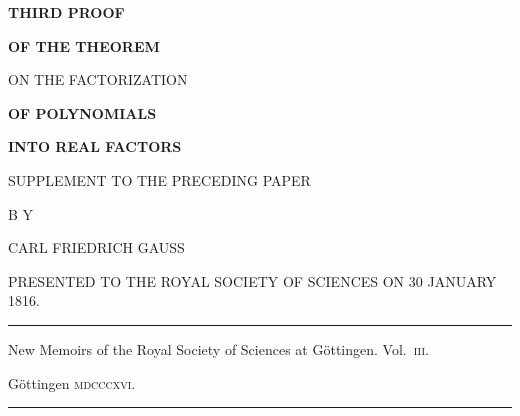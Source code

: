 \clearpage
{}
\thispagestyle{empty}
\begin{center}
\vspace*{.25in}
{\large\bfseries THIRD PROOF}\par
\vspace{.35in}
{\Large\bfseries OF THE THEOREM\par
\medskip ON THE FACTORIZATION}\par
\vspace{.35in}
{\bfseries OF POLYNOMIALS}\par
\vspace{.35in}
{\large\bfseries INTO REAL FACTORS}\par
\vspace{.5in}
SUPPLEMENT TO THE PRECEDING PAPER\par
\vspace{.5in}
B Y\par
\vspace{.3in}
{\large CARL FRIEDRICH GAUSS}\par
\vspace{.4in}
PRESENTED TO THE ROYAL SOCIETY OF SCIENCES ON 30 JANUARY 1816.\par
\vspace{.65in}
\rule{.88\linewidth}{.3pt}\par
\medskip
{\small New Memoirs of the Royal Society of Sciences at Göttingen. Vol.~\textsc{iii}.\par}
\medskip
Göttingen \textsc{mdcccxvi}.\par
\medskip
\rule{.88\linewidth}{.3pt}
\end{center}
\clearpage
